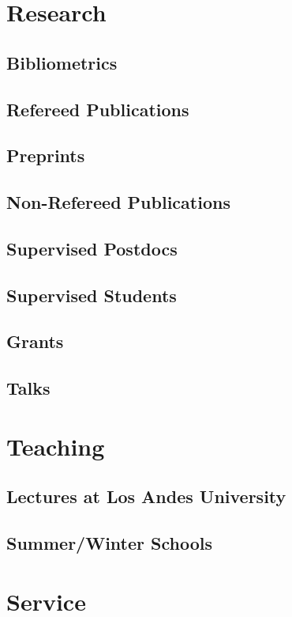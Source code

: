 \documentclass[a4paper,10pt]{article} %
\begin{document}
\color{red}
\section{Research}
\color{black}

\subsection{Bibliometrics}
\subsection{Refereed Publications}
\subsection{Preprints}
\subsection{Non-Refereed Publications}
\subsection{Supervised Postdocs}
\subsection{Supervised Students}
\subsection{Grants}
\subsection{Talks}

\color{red}
\section{Teaching}
\color{black}
\subsection{Lectures at Los Andes University}
\subsection{Summer/Winter Schools}

\color{red}
\section{Service}
\color{black}
\end{document}
